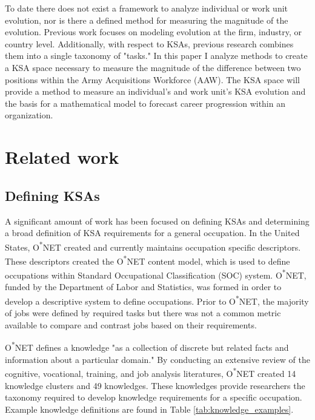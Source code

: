 \documentclass[12pt]{article}
\begin{document}
To date there does not exist a framework to analyze individual or work unit evolution, nor is there a defined method for measuring the magnitude of the evolution. Previous work focuses on modeling evolution at the firm, industry, or country level. Additionally, with respect to KSAs, previous research combines them into a single taxonomy of "tasks." In this paper I analyze methods to create a KSA space necessary to measure the magnitude of the difference between two positions within the Army Acquisitions Workforce (AAW). The KSA space will provide a method to measure an individual's and work unit's KSA evolution and the basis for a mathematical model to forecast career progression within an organization.

\section{Related work}

\subsection{Defining KSAs}

A significant amount of work has been focused on defining KSAs and determining a broad definition of KSA requirements for a general occupation. In the United States, O\textsuperscript{*}NET created and currently maintains occupation specific descriptors. These descriptors created the O\textsuperscript{*}NET content model, which is used to define occupations within Standard Occupational Classification (SOC) system. O\textsuperscript{*}NET, funded by the Department of Labor and Statistics, was formed in order to develop a descriptive system to define occupations. Prior to O\textsuperscript{*}NET, the majority of jobs were defined by required tasks but there was not a common metric available to compare and contrast jobs based on their requirements.\cite{onet_content_model}

O\textsuperscript{*}NET defines a knowledge "as a collection of discrete but related facts and information about a particular domain."\cite{knowledges} By conducting an extensive review of the cognitive, vocational, training, and job analysis literatures, O\textsuperscript{*}NET created 14 knowledge clusters and 49 knowledges.\cite{knowledges} These knowledges provide researchers the taxonomy required to develop knowledge requirements for a specific occupation. Example knowledge definitions are found in Table \ref{tab:knowledge_examples}.
\end{document}
